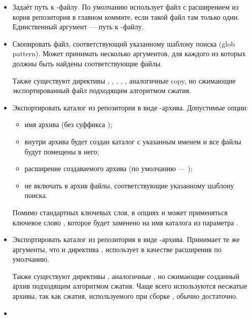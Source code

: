 \begin{itemize}
	\item {}
	
	Задаёт путь к -файлу. По умолчанию  использует файл с
		расширением  из корня репозитория в главном коммите,
		если такой файл там только один. Единственный аргумент --- путь к -файлу.
	
	\item {}
	Скопировать файл, соответствующий указанному шаблону поиска (glob pattern).
		Может принимать несколько аргументов, для каждого из которых должны
		быть найдены соответствующие файлы.
	
	Также существуют директивы , , , , ,
		аналогичные copy, но сжимающие экспортированный файл подходящим алгоритмом сжатия.
	\item  {}

	Экспортировать каталог из репозитория в виде -архива. Допустимые опции:
	\begin{itemize}
		\item {} имя архива (без суффикса );
		\item {} внутри архива будет создан каталог с указанным именем
			и все файлы будут помещены в него;
		\item {} расширение создаваемого архива (по умолчанию --- );
		\item {} не включать в архив файлы, соответствующие указанному шаблону поиска.
	\end{itemize}
	
	Помимо стандартных ключевых слов, в опциях  и  может применяться ключевое
		слово , которое будет заменено на имя каталога из параметра .
	\item {}
	
	Экспортировать каталог из репозитория в виде -архива. Принимает те же аргументы,
		что и директива , использует  в качестве расширения по умолчанию.
	
	Также существуют директивы , аналогичные
		, но сжимающие созданный архив подходящим алгоритмом сжатия. Чаще всего используются
		несжатые архивы, так как сжатия, используемого при сборке , обычно достаточно.
	\item  {}
	

\end{itemize}
